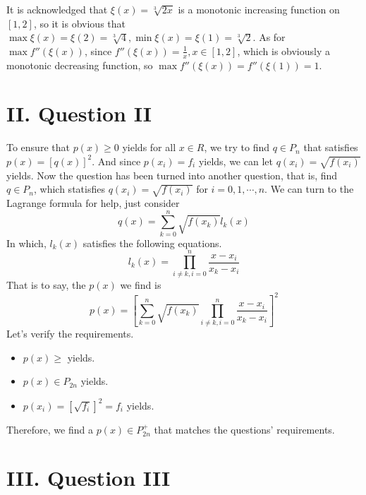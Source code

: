 \documentclass[a4paper]{article}
\begin{document}
It is acknowledged that $\xi(x)=\sqrt[3]{2x}$ is a monotonic increasing function on $[1,2]$, so it is obvious
that $\max{\xi(x)}=\xi(2)=\sqrt[3]{4}, \min{\xi(x)}=\xi(1)=\sqrt[3]{2}$. As for $\max{f''(\xi(x))}$, since $f''(\xi(x))=\frac{1}{x},x\in[1,2]$,
which is obviously a monotonic decreasing function, so $\max{f''(\xi(x))}=f''(\xi(1))=1$.


\section*{II. Question II}
To ensure that $p(x)\geq 0$ yields for all $x\in R$, we try to find $q \in P_n$ that satisfies $p(x)=[q(x)]^2$. And since $p(x_i)=f_i$ yields, we can let $q(x_i)=\sqrt{f(x_i)}$ yields.
Now the question has been turned into another question, that is, find $q\in P_n$, which statisfies $q(x_i)=\sqrt{f(x_i)}$ for $i=0,1,\cdots,n$. We can turn to the Lagrange formula for help,
just consider
\begin{equation}
  q(x)=\sum_{k=0}^n\sqrt{f(x_k)}l_k(x)
\end{equation}
In which, $l_k(x)$ satisfies the following equations.
\begin{equation}
  l_k(x)=\prod_{i\neq k,i=0}^n\frac{x-x_i}{x_k-x_i}
\end{equation}
That is to say, the $p(x)$ we find is 
\begin{equation}
  p(x)=[\sum_{k=0}^n\sqrt{f(x_k)}\prod_{i\neq k,i=0}^n\frac{x-x_i}{x_k-x_i}]^2
\end{equation}
Let's verify the requirements.
\begin{itemize}
  \item $p(x)\geq$ yields.
  \item $p(x) \in P_{2n}$ yields.
  \item $p(x_i)=[\sqrt{f_i}]^2=f_i$ yields.
\end{itemize}
Therefore, we find a $p(x)\in P_{2n}^{+}$ that matches the questions' requirements.

\section*{III. Question III}
\end{document}
